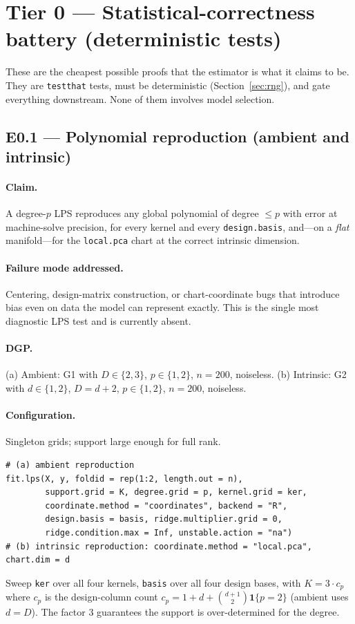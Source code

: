\documentclass[11pt]{article}
\newcommand{\code}[1]{\texttt{#1}}
\begin{document}
\section{Tier 0 — Statistical-correctness battery (deterministic tests)}

These are the cheapest possible proofs that the estimator is what it claims to be. They are
\code{testthat} tests, must be deterministic (Section~\ref{sec:rng}), and gate everything
downstream. None of them involves model selection.

\subsection{E0.1 — Polynomial reproduction (ambient and intrinsic)}

\paragraph{Claim.} A degree-$p$ LPS reproduces any global polynomial of degree $\le p$ with
error at machine-solve precision, for every kernel and every \code{design.basis}, and—on a
\emph{flat} manifold—for the \code{local.pca} chart at the correct intrinsic dimension.

\paragraph{Failure mode addressed.} Centering, design-matrix construction, or
chart-coordinate bugs that introduce bias even on data the model can represent exactly. This
is the single most diagnostic LPS test and is currently absent.

\paragraph{DGP.} (a) Ambient: G1 with $D\in\{2,3\}$, $p\in\{1,2\}$, $n=200$, noiseless.
(b) Intrinsic: G2 with $d\in\{1,2\}$, $D=d+2$, $p\in\{1,2\}$, $n=200$, noiseless.

\paragraph{Configuration.} Singleton grids; support large enough for full rank.
\begin{lstlisting}
# (a) ambient reproduction
fit.lps(X, y, foldid = rep(1:2, length.out = n),
        support.grid = K, degree.grid = p, kernel.grid = ker,
        coordinate.method = "coordinates", backend = "R",
        design.basis = basis, ridge.multiplier.grid = 0,
        ridge.condition.max = Inf, unstable.action = "na")
# (b) intrinsic reproduction: coordinate.method = "local.pca", chart.dim = d
\end{lstlisting}
Sweep \code{ker} over all four kernels, \code{basis} over all four design bases, with
$K = 3\cdot c_p$ where $c_p$ is the design-column count $c_p=1+d+\binom{d+1}{2}\mathbf{1}\{p=2\}$
(ambient uses $d=D$). The factor $3$ guarantees the support is over-determined for the degree.
\end{document}
